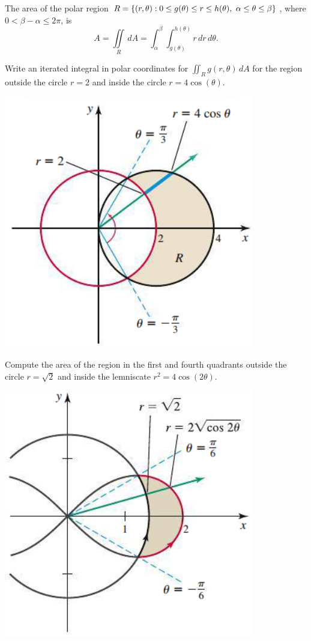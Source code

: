 \documentclass[mathNotesPreamble]{subfiles}
\begin{document}
  \begin{thmBox*}
    The area of the polar region $R={\left\{(r,\theta): 0\leq g(\theta)\leq r\leq h(\theta),\ \alpha\leq \theta\leq\beta\right\}}$, where $0<\beta-\alpha\leq 2\pi$, is
      \[A=\iint\limits_R\,dA=\int_\alpha^\beta \int_{g(\theta)}^{h(\theta)}r\,dr\,d\theta.\]
  \end{thmBox*}
  \pagebreak

  \begin{ex*}
    Write an iterated integral in polar coordinates for $\iint_R g(r,\theta)\,dA$ for the region outside the circle $r=2$ and inside the circle $r=4\cos(\theta)$.
  \end{ex*}
  \begin{flushright}
    \includegraphics[width=0.35\linewidth]{images/briggs_16_03/fig16_35}
  \end{flushright}
  \pagebreak

  \begin{ex*}
    Compute the area of the region in the first and fourth quadrants outside the circle $r=\sqrt{2}$ and inside the lemniscate $r^2=4\cos(2\theta)$.
  \end{ex*}
  \begin{flushright}
    \includegraphics[width=0.35\linewidth]{images/briggs_16_03/fig16_37}
  \end{flushright}  
  \pagebreak
\end{document}
